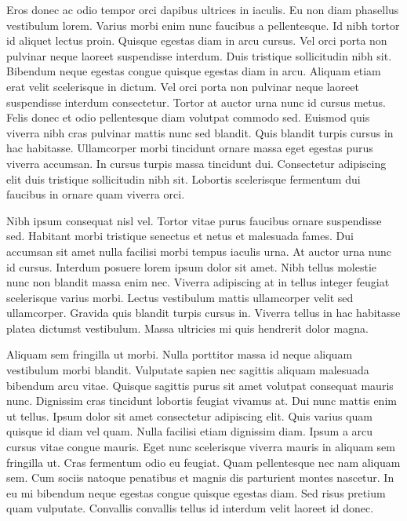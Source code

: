 \documentclass[11pt,a4paper]{article}
\begin{document}
Eros donec ac odio tempor orci dapibus ultrices in iaculis. Eu non diam phasellus vestibulum lorem. Varius morbi enim nunc faucibus a pellentesque. Id nibh tortor id aliquet lectus proin. Quisque egestas diam in arcu cursus. Vel orci porta non pulvinar neque laoreet suspendisse interdum. Duis tristique sollicitudin nibh sit. Bibendum neque egestas congue quisque egestas diam in arcu. Aliquam etiam erat velit scelerisque in dictum. Vel orci porta non pulvinar neque laoreet suspendisse interdum consectetur. Tortor at auctor urna nunc id cursus metus. Felis donec et odio pellentesque diam volutpat commodo sed. Euismod quis viverra nibh cras pulvinar mattis nunc sed blandit. Quis blandit turpis cursus in hac habitasse. Ullamcorper morbi tincidunt ornare massa eget egestas purus viverra accumsan. In cursus turpis massa tincidunt dui. Consectetur adipiscing elit duis tristique sollicitudin nibh sit. Lobortis scelerisque fermentum dui faucibus in ornare quam viverra orci.

Nibh ipsum consequat nisl vel. Tortor vitae purus faucibus ornare suspendisse sed. Habitant morbi tristique senectus et netus et malesuada fames. Dui accumsan sit amet nulla facilisi morbi tempus iaculis urna. At auctor urna nunc id cursus. Interdum posuere lorem ipsum dolor sit amet. Nibh tellus molestie nunc non blandit massa enim nec. Viverra adipiscing at in tellus integer feugiat scelerisque varius morbi. Lectus vestibulum mattis ullamcorper velit sed ullamcorper. Gravida quis blandit turpis cursus in. Viverra tellus in hac habitasse platea dictumst vestibulum. Massa ultricies mi quis hendrerit dolor magna.

Aliquam sem fringilla ut morbi. Nulla porttitor massa id neque aliquam vestibulum morbi blandit. Vulputate sapien nec sagittis aliquam malesuada bibendum arcu vitae. Quisque sagittis purus sit amet volutpat consequat mauris nunc. Dignissim cras tincidunt lobortis feugiat vivamus at. Dui nunc mattis enim ut tellus. Ipsum dolor sit amet consectetur adipiscing elit. Quis varius quam quisque id diam vel quam. Nulla facilisi etiam dignissim diam. Ipsum a arcu cursus vitae congue mauris. Eget nunc scelerisque viverra mauris in aliquam sem fringilla ut. Cras fermentum odio eu feugiat. Quam pellentesque nec nam aliquam sem. Cum sociis natoque penatibus et magnis dis parturient montes nascetur. In eu mi bibendum neque egestas congue quisque egestas diam. Sed risus pretium quam vulputate. Convallis convallis tellus id interdum velit laoreet id donec.
\end{document}
